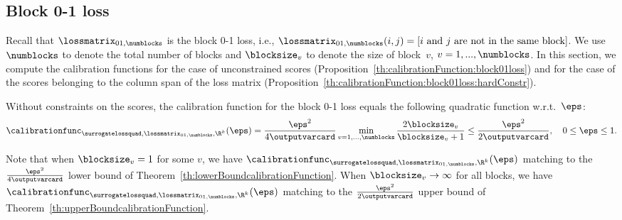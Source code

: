 \documentclass{article}
\begin{document}
\subsection{Block 0-1 loss}
\label{sec:exactTranferProofs:block01loss}
Recall that $\lossmatrix_{01,\numblocks}$ is the block 0-1 loss, i.e., $\lossmatrix_{01,\numblocks}(i, j) = [\text{$i$ and $j$ are not in the same block}]$.
We use $\numblocks$ to denote the total number of blocks and $\blocksize_v$ to denote the size of block~$v$, $v=1,...,\numblocks$.
In this section, we compute the calibration functions for the case of unconstrained scores (Proposition~\ref{th:calibrationFunction:block01loss}) and for the case of the scores belonging to the column span of the loss matrix (Proposition~\ref{th:calibrationFunction:block01loss:hardConstr}).
\begin{proposition}
    \label{th:calibrationFunction:block01loss}
    Without constraints on the scores, the calibration function for the block 0-1 loss equals the following quadratic function w.r.t.\ $\eps$:
    \[
    \calibrationfunc_{\surrogatelossquad,\lossmatrix_{01,\numblocks},\R^k}(\eps) = \frac{\eps^2}{4\outputvarcard} \min_{v=1,...,\numblocks}\frac{2 \blocksize_v}{\blocksize_v + 1} \leq \frac{\eps^2}{2\outputvarcard},
    \quad 0 \leq \eps \leq 1.
    \]
\end{proposition}
Note that when $\blocksize_v = 1$ for some $v$, we have  $\calibrationfunc_{\surrogatelossquad,\lossmatrix_{01,\numblocks},\R^k}(\eps)$ matching to the $\frac{\eps^2}{4\outputvarcard}$ lower bound of Theorem~\ref{th:lowerBoundcalibrationFunction}.
When $\blocksize_v \to \infty$ for all blocks, we have $\calibrationfunc_{\surrogatelossquad,\lossmatrix_{01,\numblocks},\R^k}(\eps)$ matching to the $\frac{\eps^2}{2\outputvarcard}$ upper bound of Theorem~\ref{th:upperBoundcalibrationFunction}.
\end{document}
